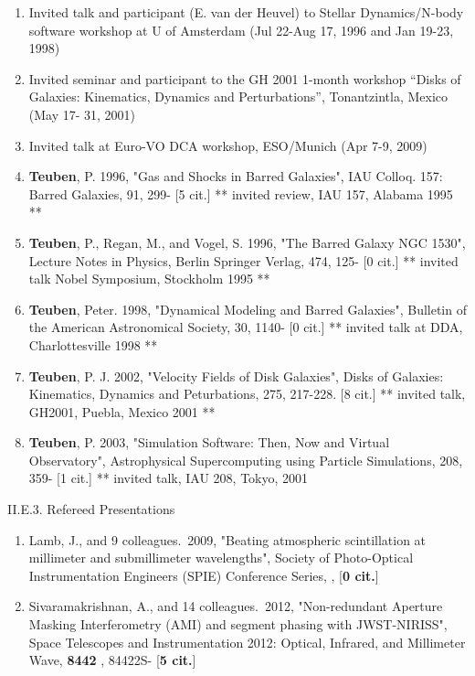 \documentclass[11pt,letterpaper]{article}
\begin{document}
\begin{enumerate}[resume,label=\textbf{\arabic*}.]  
\item
Invited talk and participant (E. van der Heuvel) to Stellar
Dynamics/N-body software workshop at U of Amsterdam (Jul 22-Aug 17,
1996 and Jan 19-23, 1998)

\item
Invited seminar and participant to the GH 2001 1-month workshop
``Disks of Galaxies:  Kinematics, Dynamics and Perturbations'',
Tonantzintla, Mexico (May 17-			31, 2001)

\item
Invited talk at Euro-VO DCA workshop, ESO/Munich (Apr 7-9, 2009)  

\item
{\bf Teuben}, P.  1996,  "Gas and Shocks in Barred Galaxies",
IAU Colloq. 157: Barred Galaxies,  91,  299- [5 cit.]
** invited review, IAU 157, Alabama 1995 **

\item
{\bf Teuben}, P., Regan, M., and Vogel, S.  1996,
"The Barred Galaxy NGC 1530", Lecture Notes in Physics, Berlin Springer Verlag,  474,  125- [0 cit.]
** invited talk Nobel Symposium, Stockholm 1995 **

\item
{\bf Teuben}, Peter.  1998,  "Dynamical Modeling and Barred Galaxies",
Bulletin of the American Astronomical Society,  30,  1140- [0 cit.]
** invited talk at DDA, Charlottesville 1998 **

\item
{\bf Teuben}, P. J.  2002,
"Velocity Fields of Disk Galaxies", Disks of Galaxies: Kinematics, Dynamics and Peturbations,  275,  217-228.  [8 cit.]
** invited talk, GH2001, Puebla, Mexico 2001 **

\item
{\bf Teuben}, P.  2003,
"Simulation Software: Then, Now and Virtual Observatory",
Astrophysical Supercomputing using Particle Simulations,  208,  359- [1 cit.]
** invited talk, IAU 208, Tokyo, 2001
\end{enumerate}

II.E.3. Refereed Presentations


\begin{enumerate}[resume,label=\textbf{\arabic*}.]

\item  
Lamb, J., and 9 colleagues.\  2009,  "Beating atmospheric scintillation at 
millimeter and submillimeter wavelengths", Society of Photo-Optical 
Instrumentation Engineers (SPIE) Conference Series,  ,  [{\bf 0 cit.}] 
  

\item  
Sivaramakrishnan, A., and 14 colleagues.\  2012,  "Non-redundant Aperture 
Masking Interferometry (AMI) and segment phasing with JWST-NIRISS", Space 
Telescopes and Instrumentation 2012: Optical, Infrared, and Millimeter 
Wave,  {\bf 8442} , 84422S- [{\bf 5 cit.}] 

\end{enumerate}
\end{document}
